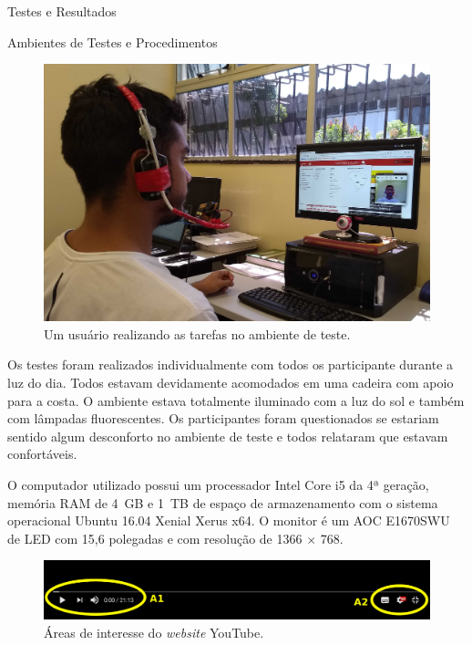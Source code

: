 \begin{chapter}{Testes e Resultados}
\begin{section}{Ambientes de Testes e Procedimentos}
\begin{figure}[!h]
	\centering
	\includegraphics[width=1.00\linewidth]{fig/denes}
	\caption{Um usuário realizando as tarefas no ambiente de teste.}
	\label{fig:ambiente}
\end{figure}

Os testes foram realizados individualmente com todos os participante durante a
luz do dia. Todos estavam devidamente acomodados em uma cadeira com apoio para
a costa. O ambiente estava totalmente iluminado com a luz do sol e também com 
lâmpadas fluorescentes. Os participantes foram questionados se estariam
sentido algum desconforto  no ambiente de teste e todos relataram que
estavam confortáveis. 

O computador utilizado possui um processador Intel Core i5 da 4ª geração,
memória RAM de 4~GB e 1~TB de espaço de armazenamento com o sistema operacional
Ubuntu 16.04 Xenial Xerus x64. O monitor é um AOC E1670SWU de LED com 15,6
polegadas e com resolução de 1366 $\times$ 768.

\begin{figure}[!b]
	\centering
	\includegraphics[width=.8\linewidth]{fig/YT}
	\caption{Áreas de interesse do \textit{website} YouTube.}
	\label{fig:youtube}
\end{figure}


\end{section}
\end{chapter}
